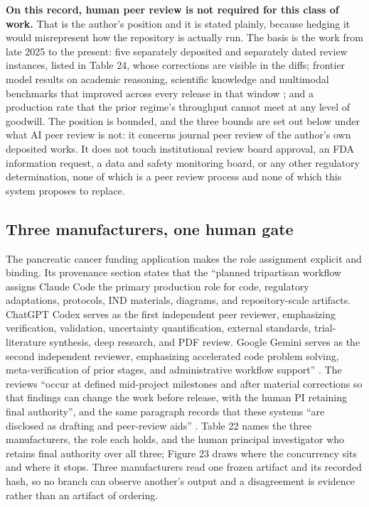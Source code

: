 \textbf{On this record, human peer review is not required for this class of
work.} That is the author's position and it is stated plainly, because hedging
it would misrepresent how the repository is actually run. The basis is the work
from late 2025 to the present: five separately deposited and separately dated
review instances, listed in Table 24, whose corrections are visible in the
diffs; frontier model results on academic reasoning, scientific knowledge and
multimodal benchmarks that improved across every release in that window
\cite{aiprgliomatc}; and a production rate that the prior regime's throughput
cannot meet at any level of goodwill. The position is bounded, and the three
bounds are set out below under what AI peer review is not: it concerns journal
peer review of the author's own deposited works. It does not touch institutional
review board
approval, an FDA information request, a data and safety monitoring board, or any
other regulatory determination, none of which is a peer review process and none
of which this system proposes to replace.

\subsection{Three manufacturers, one human gate}

The pancreatic cancer funding application makes the role assignment explicit and
binding. Its provenance section states that the ``planned tripartisan workflow
assigns Claude Code the primary production role for code, regulatory
adaptations, protocols, IND materials, diagrams, and repository-scale artifacts.
ChatGPT Codex serves as the first independent peer reviewer, emphasizing
verification, validation, uncertainty quantification, external standards,
trial-literature synthesis, deep research, and PDF review. Google Gemini serves
as the second independent reviewer, emphasizing accelerated code problem
solving, meta-verification of prior stages, and administrative workflow
support'' \cite{rfarm27001v2}. The reviews ``occur at defined mid-project
milestones and after material corrections so that findings can change the work
before release, with the human PI retaining final authority'', and the same
paragraph records that these systems ``are disclosed as drafting and peer-review
aids'' \cite{rfarm27001v2}. Table 22 names the three manufacturers, the role
each holds, and the human principal investigator who retains final authority
over all three; Figure 23 draws where the concurrency sits and where it stops.
Three manufacturers read one frozen artifact and its recorded hash, so no branch
can observe another's output and a disagreement is evidence rather than an
artifact of ordering.

